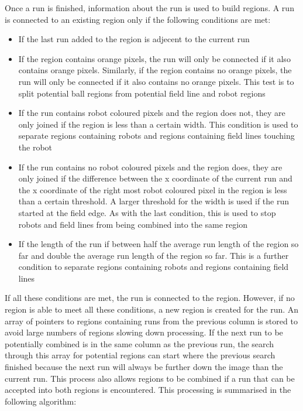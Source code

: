 \documentclass[runningheads,a4paper]{llncs}
\begin{document}
Once a run is finished, information about the run is used to build regions. A run is connected to an existing region only if the following conditions are met: \begin{itemize}
\item{If the last run added to the region is adjecent to the current run}
\item{If the region contains orange pixels, the run will only be connected if it also contains orange pixels. Similarly, if the region contains no orange pixels, the run will only be connected if it also contains no orange pixels. This test is to split potential ball regions from potential field line and robot regions}
\item{If the run contains robot coloured pixels and the region does not, they are only joined if the region is less than a certain width. This condition is used to separate regions containing robots and regions containing field lines touching the robot}
\item{If the run contains no robot coloured pixels and the region does, they are only joined if the difference between the x coordinate of the current run and the x coordinate of the right most robot coloured pixel in the region is less than a certain threshold. A larger threshold for the width is used if the run started at the field edge. As with the last condition, this is used to stop robots and field lines from being combined into the same region}
\item{If the length of the run if between half the average run length of the region so far and double the average run length of the region so far. This is a further condition to separate regions containing robots and regions containing field lines}
\end{itemize}
If all these conditions are met, the run is connected to the region. However, if no region is able to meet all these conditions, a new region is created for the run. An array of pointers to regions containing runs from the previous column is stored to avoid large numbers of regions slowing down processing. If the next run to be potentially combined is in the same column as the previous run, the search through this array for potential regions can start where the previous search finished because the next run will always be further down the image than the current run. This process also allows regions to be combined if a run that can be accepted into both regions is encountered. This processing is summarised in the following algorithm:
\end{document}
